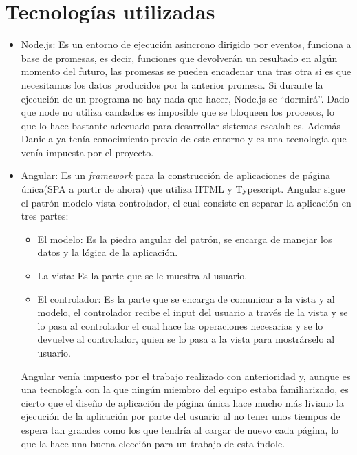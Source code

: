 \documentclass[11pt]{book}
\begin{document}
\chapter{Tecnologías utilizadas}
\begin{itemize}
	\item Node.js: Es un entorno de ejecución asíncrono dirigido por eventos, funciona a base de promesas, es decir, funciones que devolverán un resultado en algún momento del futuro, las promesas se pueden encadenar una tras otra si es que necesitamos los datos producidos por la anterior promesa. Si durante la ejecución de un programa no hay nada que hacer, Node.js se “dormirá”. 
	Dado que node no utiliza candados es imposible que se bloqueen los procesos, lo que lo hace bastante adecuado para desarrollar sistemas escalables. Además Daniela ya tenía conocimiento previo de este entorno y es una tecnología que venía impuesta por el proyecto.
	
	\item Angular: Es un \emph{framework} para la construcción de aplicaciones de página única(SPA a partir de ahora) que utiliza HTML y Typescript. Angular sigue el patrón modelo-vista-controlador, el cual consiste en separar la aplicación en tres partes:
	\begin{itemize}
		\item El modelo: Es la piedra angular del patrón, se encarga de manejar los datos y la lógica de la aplicación.
		\item La vista: Es la parte que se le muestra al usuario.
		\item El controlador: Es la parte que se encarga de comunicar a la vista y al modelo, el controlador recibe el input del usuario a través de la vista y se lo pasa al controlador el cual hace las operaciones necesarias y se lo devuelve al controlador, quien se lo pasa a la vista para mostrárselo al usuario.
	\end{itemize}
	
	
	Angular venía impuesto por el trabajo realizado con anterioridad y, aunque es una tecnología con la que ningún miembro del equipo  estaba familiarizado, es cierto que el diseño de aplicación de página única hace mucho más liviano la ejecución de la aplicación por parte del usuario al no tener unos tiempos de espera tan grandes como los que tendría al cargar de nuevo cada página, lo que la hace una buena elección para un trabajo de esta índole.
	

\end{itemize}
\end{document}
